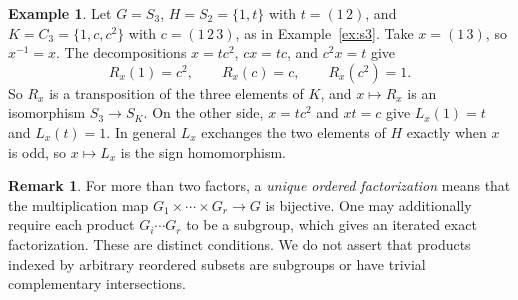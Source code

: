 \documentclass[12pt,letterpaper]{article}
\numberwithin{equation}{section}
\theoremstyle{definition}
\newtheorem{example}[theorem]{Example}
\newtheorem{remark}[theorem]{Remark}
\begin{document}
\begin{example}\label{ex:s3actions}
Let $G=S_3$, $H=S_2=\{1,t\}$ with $t=(1\,2)$, and $K=C_3=\{1,c,c^2\}$ with $c=(1\,2\,3)$, as in Example~\ref{ex:s3}. Take $x=(1\,3)$, so $x^{-1}=x$. The decompositions $x=tc^2$, $cx=tc$, and $c^2x=t$ give
\[
R_x(1)=c^2,\qquad R_x(c)=c,\qquad R_x(c^2)=1.
\]
So $R_x$ is a transposition of the three elements of $K$, and $x\mapsto R_x$ is an isomorphism $S_3\to S_K$. On the other side, $x=tc^2$ and $xt=c$ give $L_x(1)=t$ and $L_x(t)=1$. In general $L_x$ exchanges the two elements of $H$ exactly when $x$ is odd, so $x\mapsto L_x$ is the sign homomorphism.
\end{example}
\begin{remark}
For more than two factors, a \emph{unique ordered factorization} means that the multiplication map $G_1\times\cdots\times G_r\to G$ is bijective. One may additionally require each product $G_i\cdots G_r$ to be a subgroup, which gives an iterated exact factorization. These are distinct conditions. We do not assert that products indexed by arbitrary reordered subsets are subgroups or have trivial complementary intersections.
\end{remark}
\end{document}
